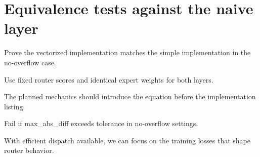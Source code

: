 \section{Equivalence tests against the naive layer}
\label{sec:ch06-equivalence-tests-against-the-naive-layer}

Prove the vectorized implementation matches the simple implementation in the no-overflow case.



Use fixed router scores and identical expert weights for both layers.



The planned mechanics should introduce the equation before the implementation listing.





\begin{checkpointbox}
Fail if max\_abs\_diff exceeds tolerance in no-overflow settings.
\end{checkpointbox}

With efficient dispatch available, we can focus on the training losses that shape router behavior.

